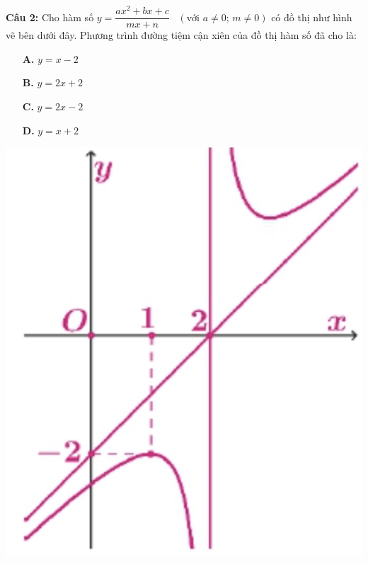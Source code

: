 \documentclass[12pt, a4paper]{article}
\begin{document}
\begin{minipage}{0.7\textwidth}
    \noindent
    \textbf{Câu 2:} Cho hàm số $y = \dfrac{ax^2 + bx + c}{mx + n}$ \, $(\text{với } a \neq 0; \, m \neq 0)$ có đồ thị như hình vẽ bên dưới đây. Phương trình đường tiệm cận xiên của đồ thị hàm số đã cho là:
    
    \begin{multicols}{2}
        \begin{enumerate}
            \item[\textbf{A.}] $y = x - 2$
            \item[\textbf{B.}] $y = 2x + 2$
            \item[\textbf{C.}] $y = 2x - 2$
            \item[\textbf{D.}] $y = x + 2$
        \end{enumerate}
    \end{multicols}
\end{minipage}%
\hfill
\begin{minipage}{0.3\textwidth}
    \centering
    \includegraphics[scale=0.45]{../assets/1.png} %
\end{minipage}
\end{document}
